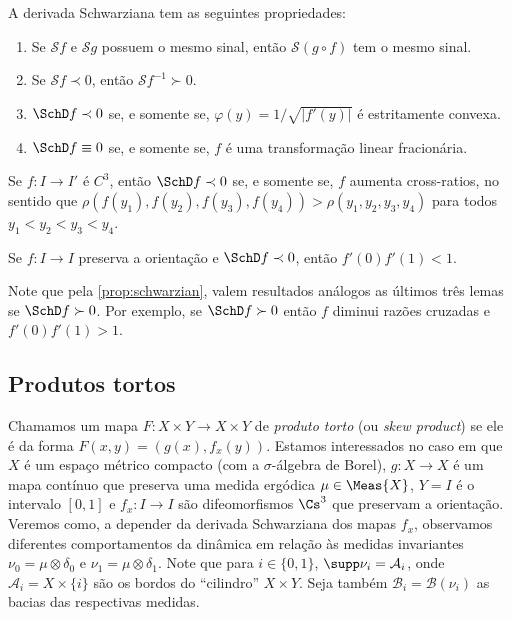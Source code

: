 \documentclass[../fapesp0]{subfiles}
\begin{document}
\begin{proposition}\label{prop:schwarzian}
  A derivada Schwarziana tem as seguintes propriedades:
  \begin{enumerate}
    \item Se \(\mathcal{S}f\) e \(\mathcal{S}g\) possuem o mesmo sinal, então \(\mathcal{S}(g \circ f)\) tem o mesmo sinal.
    \item Se \(\mathcal{S}f \prec 0\), então \(\mathcal{S}f^{-1} \succ 0\). 
    \item \(\SchD f \prec 0\) se, e somente se, \(\varphi(y) = 1/ \sqrt{\lvert f'(y) \rvert}\) é estritamente convexa.
    \item \(\SchD f \equiv 0\) se, e somente se, \(f\) é uma transformação linear fracionária.
  \end{enumerate}
\end{proposition}

\begin{lemma}\label{lem:sch-cross-increase}
  Se \(f \colon I \to I'\) é \(C^3\), então \(\SchD f \prec 0\) se, e somente se, \(f\) aumenta cross-ratios, no sentido que \(\rho(f(y_{1}),f(y_2),f(y_3),f(y_4)) > \rho(y_{1},y_2,y_3,y_4)\) para todos \(y_1 < y_2 < y_3 < y_{4}\).
\end{lemma}

\begin{lemma}\label{lem:bound-deriv-schwarz}
  Se \(f \colon I \to I\) preserva a orientação e \(\SchD f \prec 0\), então \(f'(0)f'(1) < 1\).
\end{lemma}

Note que pela \cref{prop:schwarzian}, valem resultados análogos as últimos três lemas se \(\SchD f \succ 0\). Por exemplo, se \(\SchD f \succ 0\) então \(f\) diminui razões cruzadas e \(f'(0)f'(1) > 1\). 

\subsection{Produtos tortos}
Chamamos um mapa \(F \colon X \times Y \to X \times Y\) de \emph{produto torto} (ou \textit{skew product}) se ele é da forma \(F(x,y) = (g(x), f_x(y))\). Estamos interessados no caso em que \(X\) é um espaço métrico compacto (com a \(\sigma\)-álgebra de Borel), \(g \colon X \to X\) é um mapa contínuo que preserva uma medida ergódica \(\mu \in \Meas{X}\), \(Y = I\) é o intervalo \([0,1]\) e \(f_x \colon I \to I\) são difeomorfismos \(\Cs^3\) que preservam a orientação. Veremos como, a depender da derivada Schwarziana dos mapas \(f_x\), observamos diferentes comportamentos da dinâmica em relação às medidas invariantes \(\nu_0 = \mu \otimes \delta_0\) e \(\nu_1 = \mu \otimes \delta_1\). Note que para \(i \in \{ 0,1 \}\), \(\supp \nu_i = \mathcal{A}_i\), onde \(\mathcal{A}_i = X \times \{ i \}\) são os bordos do ``cilindro'' \(X \times Y\).
Seja também \(\mathcal{B}_i = \mathcal{B}(\nu_i)\) as bacias das respectivas medidas.
\end{document}
